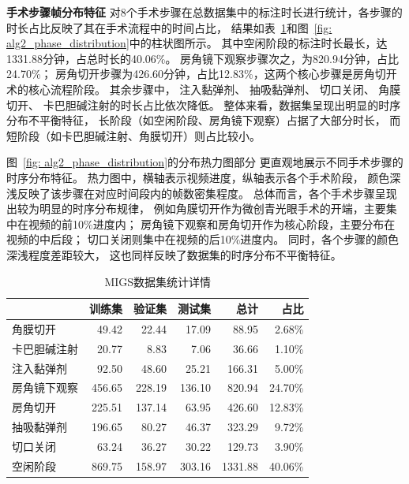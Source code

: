 \textbf{手术步骤帧分布特征}\quad 
对8个手术步骤在总数据集中的标注时长进行统计，各步骤的时长占比反映了其在手术流程中的时间占比，
结果如表~\ref{tab:task1_stat_time}和图~\ref{fig: alg2_phase_distribution}中的柱状图所示。
其中空闲阶段的标注时长最长，达1331.88分钟，占总时长的40.06\%。
房角镜下观察步骤次之，为820.94分钟，占比24.70\%；
房角切开步骤为426.60分钟，占比12.83\%，这两个核心步骤是房角切开术的核心流程阶段。
其余步骤中，
注入黏弹剂、
抽吸黏弹剂、
切口关闭、
角膜切开、
卡巴胆碱注射的时长占比依次降低。
整体来看，数据集呈现出明显的时序分布不平衡特征，
长阶段（如空闲阶段、房角镜下观察）占据了大部分时长，
而短阶段（如卡巴胆碱注射、角膜切开）则占比较小。

图~\ref{fig: alg2_phase_distribution}的分布热力图部分
更直观地展示不同手术步骤的时序分布特征。
热力图中，横轴表示视频进度，纵轴表示各个手术阶段，
颜色深浅反映了该步骤在对应时间段内的帧数密集程度。
总体而言，各个手术步骤呈现出较为明显的时序分布规律，
例如角膜切开作为微创青光眼手术的开端，主要集中在视频的前10\%进度内；
房角镜下观察和房角切开作为核心阶段，主要分布在视频的中后段；
切口关闭则集中在视频的后10\%进度内。
同时，各个步骤的颜色深浅程度差距较大，
这也同样反映了数据集的时序分布不平衡特征。

\begin{table}[!htbp]
\small
\renewcommand{\arraystretch}{1.0}
\renewcommand{\tabcolsep}{6pt}
\begin{center}
\caption{MIGS数据集统计详情}
\begin{tabular}{lrrrrr}
\toprule
  & 训练集 & 验证集 & 测试集 & 总计 & 占比 \\
\midrule
角膜切开 & 49.42 & 22.44 & 17.09 & 88.95 & 2.68\%\\
卡巴胆碱注射 & 20.77 & 8.83 & 7.06 & 36.66 & 1.10\%\\
注入黏弹剂 & 92.50 & 48.60 & 25.21 & 166.31 & 5.00\%\\
房角镜下观察 & 456.65 & 228.19 & 136.10 & 820.94 & 24.70\%\\
房角切开 & 225.51 & 137.14 & 63.95 & 426.60 & 12.83\%\\
抽吸黏弹剂 & 196.65 & 80.27 & 46.37 & 323.29 & 9.72\%\\
切口关闭 & 63.24 & 36.27 & 30.22 & 129.73 & 3.90\%\\
空闲阶段 & 869.75 & 158.97 & 303.16 & 1331.88 & 40.06\% \\
\bottomrule
\end{tabular}
\label{tab:task1_stat_time}
\end{center}
\end{table}

